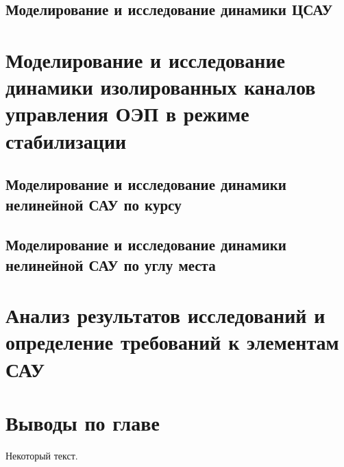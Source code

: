\subsection{Моделирование и исследование динамики ЦСАУ} \label{subsec:ch4/sect5/sub3}



\section{Моделирование и исследование динамики изолированных каналов управления ОЭП в режиме стабилизации} \label{ch:ch4/sect6}


\subsection{Моделирование и исследование динамики нелинейной САУ по курсу} \label{subsec:ch4/sect6/sub1}


\subsection{Моделирование и исследование динамики нелинейной САУ по углу места} \label{subsec:ch4/sect6/sub2}


\section{Анализ результатов исследований и определение требований к элементам САУ} \label{ch:ch4/sect7}


\section{Выводы по главе} \label{ch:ch4/sect8}



Некоторый текст.

\clearpage